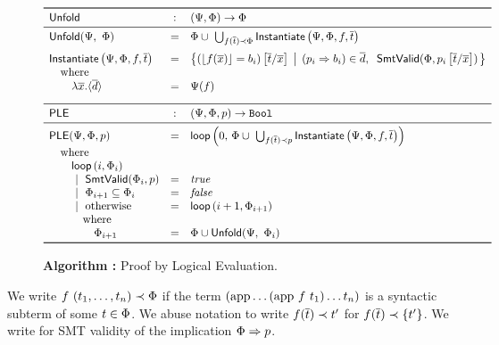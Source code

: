 \begin{figure}[t!]
$$\begin{array}{lcl}
\toprule
\uinstsym & : & (\Renv, \Penv) \rightarrow \Penv \\
\midrule
\uinst{\Renv}{\Penv} & = &
  \Penv \cup \
  \bigcup_{\issubterm{\fapp{\rfun}{\expr}}{\Penv}}
    \inst{\Renv}{\Penv}{\rfun}{\exprs} \\[0.1in]

\inst{\Renv}{\Penv}{\rfun}{\exprs} & = &
  \left \{ \SUBSTS{\left(\tosmt{\fapp{\rfun}{x}} = \body_i\right)}{x}{\expr}\;
  \left|\;\, \left( \pred_i \Rightarrow \body_i \right) \in \overline{d}
  ,      \;\; \smtIsValid{\Penv}{\SUBSTS{\pred_i}{x}{\expr}}
  \right.
  \right \}\\
\quad \mbox{where} & & \\
\quad \quad \rbody{x}{d} & = & \Renv(\rfun) \\[0.1in]

\midrule
\pbesym & : & (\Renv, \Penv, \pred) \rightarrow \tbool \\
\midrule
\pbe{\Renv}{\Penv}{\pred} & = & \pbeloop{0}{\,\Penv\cup \
  \bigcup_{\issubterm{\fapp{\rfun}{\expr}}{\pred}}
    \inst{\Renv}{\Penv}{\rfun}{\exprs} } \\
\quad \mbox{where} & & \\
\quad \quad \pbeloop{i}{\Penv_i} & & \\
\quad \quad \spmid \smtIsValid{\Penv_i}{\pred}      & = & \ttrue \\
\quad \quad \spmid \Penv_{i+1} \subseteq \Penv_i    & = & \tfalse \\
\quad \quad \spmid \mbox{otherwise}                 & = & \pbeloop{i+1}{\Penv_{i+1}} \\
\quad \quad \quad  \mbox{where}                     &   & \\
\quad \quad \quad  \quad \Penv_{i+1}                & = & \Penv \cup \uinst{\Renv}{\Penv_i} \\
\bottomrule
\end{array}$$
\caption{\textbf{Algorithm \pbesym:} Proof by Logical Evaluation.}
\label{fig:pbe}
\label{fig:inst}
\label{fig:uinst}
\end{figure}

%
We write
$f\ (t_1, \dots, t_n) \prec \Phi$
if the \smtlan term
$(\text{app} \dots (\text{app}\ f \ t_1) \dots t_n)$
is a syntactic subterm of some $t \in \Phi$.
%
We abuse notation to write
$f({\overline{t}}) \prec t'$
for
$f({\overline{t}}) \prec \{t'\}$.
%
We write \smtIsValid{\Penv}{\pred}
for SMT validity of the implication
$\Phi \Rightarrow p$.


